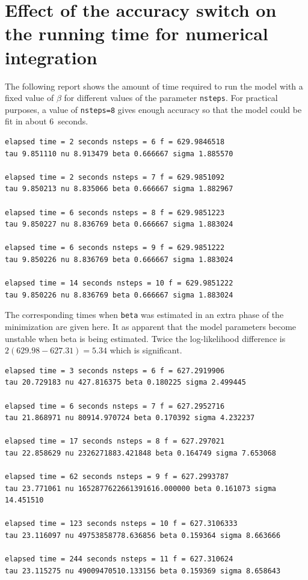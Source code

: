\documentclass{admbmanual}
\begin{document}
\section{Effect of the accuracy switch on the\br
  running time for numerical integration}

The following report shows the amount of time required to run the model with a
fixed value of $\beta$ for different values of the parameter \texttt{nsteps}.
For practical purposes, a value of \texttt{nsteps=8} gives enough accuracy so
that the model could be fit in about 6~seconds.
\begin{lstlisting}
elapsed time = 2 seconds nsteps = 6 f = 629.9846518
tau 9.851110 nu 8.913479 beta 0.666667 sigma 1.885570

elapsed time = 2 seconds nsteps = 7 f = 629.9851092
tau 9.850213 nu 8.835066 beta 0.666667 sigma 1.882967

elapsed time = 6 seconds nsteps = 8 f = 629.9851223
tau 9.850227 nu 8.836769 beta 0.666667 sigma 1.883024

elapsed time = 6 seconds nsteps = 9 f = 629.9851222
tau 9.850226 nu 8.836769 beta 0.666667 sigma 1.883024

elapsed time = 14 seconds nsteps = 10 f = 629.9851222
tau 9.850226 nu 8.836769 beta 0.666667 sigma 1.883024
\end{lstlisting}

The corresponding times when \texttt{beta} was estimated in an extra phase of
the minimization are given here. It as apparent that the model parameters become
unstable when beta is being estimated. Twice the log-likelihood difference is
$2(629.98-627.31)=5.34$ which is significant.
\begin{lstlisting}
elapsed time = 3 seconds nsteps = 6 f = 627.2919906
tau 20.729183 nu 427.816375 beta 0.180225 sigma 2.499445

elapsed time = 6 seconds nsteps = 7 f = 627.2952716
tau 21.868971 nu 80914.970724 beta 0.170392 sigma 4.232237

elapsed time = 17 seconds nsteps = 8 f = 627.297021
tau 22.858629 nu 2326271883.421848 beta 0.164749 sigma 7.653068

elapsed time = 62 seconds nsteps = 9 f = 627.2993787
tau 23.771061 nu 1652877622661391616.000000 beta 0.161073 sigma 14.451510

elapsed time = 123 seconds nsteps = 10 f = 627.3106333
tau 23.116097 nu 49753858778.636856 beta 0.159364 sigma 8.663666

elapsed time = 244 seconds nsteps = 11 f = 627.310624
tau 23.115275 nu 49009470510.133156 beta 0.159369 sigma 8.658643
\end{lstlisting}
\end{document}

